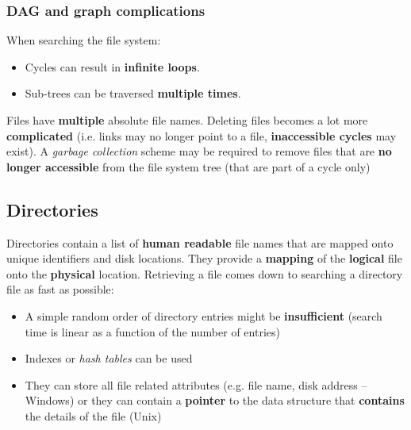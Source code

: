 \documentclass{article}
\begin{document}
\subsubsection{DAG and graph complications}
\begin{flushleft}
When searching the file system:
\begin{itemize}
	\item Cycles can result in \textbf{infinite loops}.
	\item Sub-trees can be traversed \textbf{multiple times}.
\end{itemize}
Files have \textbf{multiple} absolute file names. Deleting files becomes a lot more \textbf{complicated} (i.e. links may no longer point to a file, \textbf{inaccessible cycles} may exist). A \textit{garbage collection} scheme may be required to remove files that are \textbf{no longer accessible} from the file system tree (that are part of a cycle only)
\end{flushleft}

\subsection{Directories}
\begin{flushleft}
Directories contain a list of \textbf{human readable} file names that are mapped onto unique identifiers and disk locations. They provide a \textbf{mapping} of the \textbf{logical} file onto the \textbf{physical} location. Retrieving a file comes down to searching a directory file as fast as possible: 
\begin{itemize}
	\item A simple random order of directory entries might be \textbf{insufficient} (search time is linear as a function of the number of entries)
	\item Indexes or \textit{hash tables} can be used
	\item They can store all file related attributes (e.g. file name, disk address – Windows) or they can contain a \textbf{pointer} to the data structure that \textbf{contains} the details of the file (Unix)
\end{itemize}
\end{flushleft}
\end{document}
